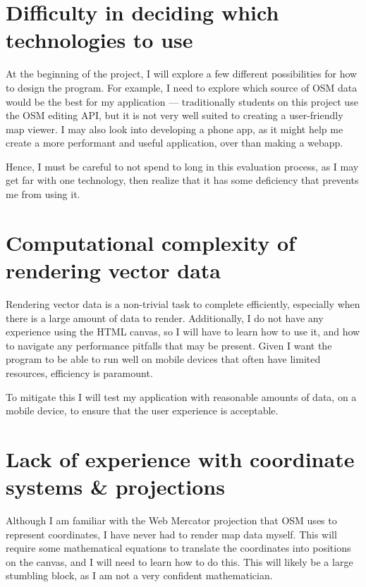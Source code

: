 \documentclass[]{final_report}
\begin{document}
\section{Difficulty in deciding which technologies to use}\label{sec:difficult-technologies}

At the beginning of the project, I will explore a few different possibilities for how to design the program. For example, I need to explore which source of OSM data would be the best for my application --- traditionally students on this project use the OSM editing API, but it is not very well suited to creating a user-friendly map viewer. I may also look into developing a phone app, as it might help me create a more performant and useful application, over than making a webapp.

Hence, I must be careful to not spend to long in this evaluation process, as I may get far with one technology, then realize that it has some deficiency that prevents me from using it.

\section{Computational complexity of rendering vector data}

Rendering vector data is a non-trivial task to complete efficiently, especially when there is a large amount of data to render. Additionally, I do not have any experience using the HTML canvas, so I will have to learn how to use it, and how to navigate any performance pitfalls that may be present. Given I want the program to be able to run well on mobile devices that often have limited resources, efficiency is paramount.

To mitigate this I will test my application with reasonable amounts of data, on a mobile device, to ensure that the user experience is acceptable. 

\section{Lack of experience with coordinate systems \& projections}\label{sec:coordinate-systems}

Although I am familiar with the Web Mercator projection that OSM uses to represent coordinates, I have never had to render map data myself. This will require some mathematical equations to translate the coordinates into positions on the canvas, and I will need to learn how to do this. This will likely be a large stumbling block, as I am not a very confident mathematician.
\end{document}

